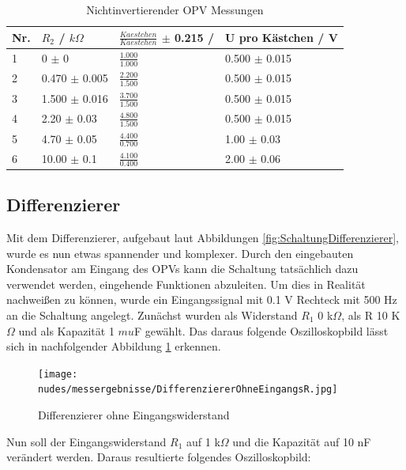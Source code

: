 \documentclass[12pt,a4paper,twoside]{article}
\begin{document}
\begin{table}[H]
    \centering
    \caption{Nichtinvertierender OPV Messungen}
    \label{tab:NioVerstärkungenGemessen}
    \begin{tabular}{| l | l | l | l |}
        \hline
        Nr. & $R_{2}$ / $k \Omega$ & $\frac{Kaestchen}{Kaestchen}$ $\pm$ 0.215 / & U pro Kästchen / V \\
        \hline
        1 &  0 $\pm$ 0 & $\frac{1.000}{1.000}$ & 0.500 $\pm$ 0.015 \\
        2 &  0.470 $\pm$ 0.005 & $\frac{2.200}{1.500}$ & 0.500 $\pm$ 0.015 \\
        3 &  1.500 $\pm$ 0.016 & $\frac{3.700}{1.500}$ & 0.500 $\pm$ 0.015 \\
        4 &  2.20 $\pm$  0.03  & $\frac{4.800}{1.500}$ & 0.500 $\pm$ 0.015 \\
        5 &  4.70 $\pm$  0.05  & $\frac{4.400}{0.700}$ & 1.00 $\pm$ 0.03 \\
        6 & 10.00 $\pm$  0.1   & $\frac{4.100}{0.400}$ & 2.00 $\pm$ 0.06 \\
        \hline
    \end{tabular}
\end{table}


\subsection{Differenzierer}

Mit dem Differenzierer, aufgebaut laut Abbildungen \ref{fig:SchaltungDifferenzierer}, wurde es nun etwas spannender und komplexer. 
Durch den eingebauten Kondensator am Eingang des OPVs kann die Schaltung tatsächlich dazu verwendet werden, eingehende Funktionen abzuleiten. 
Um dies in Realität nachweißen zu können, wurde ein Eingangssignal mit 0.1 V Rechteck mit 500 Hz an die Schaltung angelegt. Zunächst wurden als Widerstand $R_{1}$ 0 k$\Omega$, als R 10 K$\Omega$ und als Kapazität 1 $mu$F gewählt.
Das daraus folgende Oszilloskopbild lässt sich in nachfolgender Abbildung \ref{fig:Differenzierer0R1} erkennen.

\begin{figure}[H]
    \centering
    \texttt{[image: nudes/messergebnisse/DifferenziererOhneEingangsR.jpg]}
    \caption{Differenzierer ohne Eingangswiderstand}
    \label{fig:Differenzierer0R1}
\end{figure}

\noindent
Nun soll der Eingangswiderstand $R_{1}$ auf 1 k$\Omega$ und die Kapazität auf 10 nF verändert werden. Daraus resultierte folgendes Oszilloskopbild:
\end{document}
